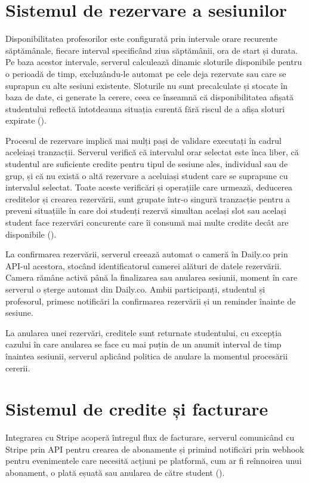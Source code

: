 \section{Sistemul de rezervare a sesiunilor}
Disponibilitatea profesorilor este configurată prin intervale orare recurente săptămânale, fiecare interval specificând ziua săptămânii, ora de start și durata. Pe baza acestor intervale, serverul calculează dinamic sloturile disponibile pentru o perioadă de timp, excluzându-le automat pe cele deja rezervate sau care se suprapun cu alte sesiuni existente. Sloturile nu sunt precalculate și stocate în baza de date, ci generate la cerere, ceea ce înseamnă că disponibilitatea afișată studentului reflectă întotdeauna situația curentă fără riscul de a afișa sloturi expirate ().

Procesul de rezervare implică mai mulți pași de validare executați în cadrul aceleiași tranzacții. Serverul verifică că intervalul orar selectat este înca liber, că studentul are suficiente credite pentru tipul de sesiune ales, individual sau de grup, și că nu există o altă rezervare a aceluiași student care se suprapune cu intervalul selectat. Toate aceste verificări și operațiile care urmează, deducerea creditelor și crearea rezervării, sunt grupate într-o singură tranzacție pentru a preveni situațiile în care doi studenți rezervă simultan același slot sau același student face rezervări concurente care îi consumă mai multe credite decât are disponibile ().

La confirmarea rezervării, serverul creează automat o cameră în Daily.co prin API-ul acestora, stocând identificatorul camerei alături de datele rezervării. Camera rămâne activă până la finalizarea sau anularea sesiunii, moment în care serverul o șterge automat din Daily.co. Ambii participanți, studentul și profesorul, primesc notificări la confirmarea rezervării și un reminder înainte de sesiune.

La anularea unei rezervări, creditele sunt returnate studentului, cu excepția cazului în care anularea se face cu mai puțin de un anumit interval de timp înaintea sesiunii, serverul aplicând politica de anulare la momentul procesării cererii.

\section{Sistemul de credite și facturare}
Integrarea cu Stripe acoperă întregul flux de facturare, serverul comunicând cu Stripe prin API pentru crearea de abonamente și primind notificări prin webhook pentru evenimentele care necesită acțiuni pe platformă, cum ar fi reînnoirea unui abonament, o plată eșuată sau anularea de către student ().


